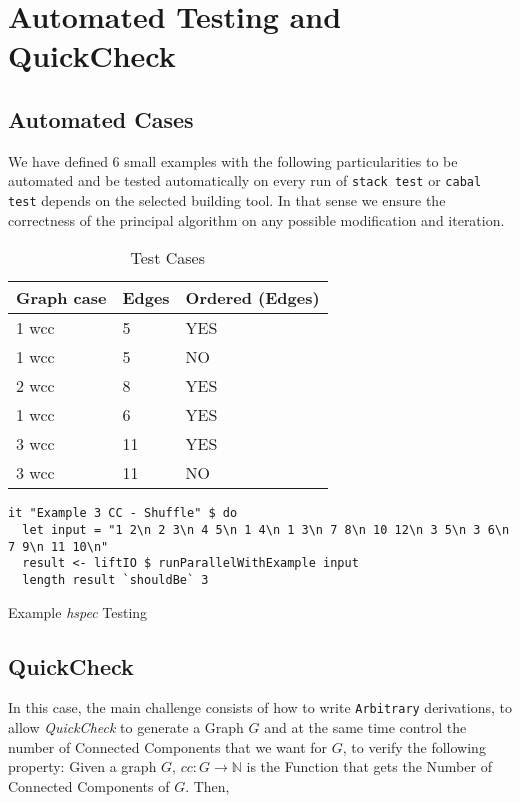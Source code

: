 \iffalse
\appendix
\section{Automated Testing and QuickCheck}\label{apx:1}
\subsection{Automated Cases}\label{auto}
We have defined 6 small examples with the following particularities to be automated and be tested automatically on every run of \texttt{stack test} or \texttt{cabal test} depends on the selected building tool. In that sense
we ensure the correctness of the principal algorithm on any possible modification and iteration. 

\begin{table}[H]
  \centering
  \begin{tabular}{|l|l|l|}
   \hline
   Graph case & Edges & Ordered (Edges)\\
   \hline
   1 \acrshort{wcc} & 5 & YES \\
   \hline
   1 \acrshort{wcc} & 5 & NO \\
   \hline
   2 \acrshort{wcc} & 8 & YES \\
   \hline
   1 \acrshort{wcc} & 6 & YES \\
   \hline
   3 \acrshort{wcc} & 11 & YES \\
   \hline
   3 \acrshort{wcc} & 11 & NO \\
   \hline
  \end{tabular}
 \caption{Test Cases}
 \label{table:apx:1}
 \end{table}

\begin{listing}[H]
\begin{verbatim}      
it "Example 3 CC - Shuffle" $ do
  let input = "1 2\n 2 3\n 4 5\n 1 4\n 1 3\n 7 8\n 10 12\n 3 5\n 3 6\n 7 9\n 11 10\n"
  result <- liftIO $ runParallelWithExample input
  length result `shouldBe` 3
\end{verbatim}
\caption{Example \textit{hspec} Testing}
\label{src:haskell:6}
\end{listing}

\subsection{QuickCheck}\label{Quick}
In this case, the main challenge consists of how to write \texttt{Arbitrary} derivations, to 
allow \textit{QuickCheck} to generate a Graph $G$ and at the same time control the number of Connected Components that we want for $G$, to verify the following property: Given a graph $G$, $cc : G \to \mathbb{N}$ is the Function that gets the Number of Connected Components of $G$.
Then,

